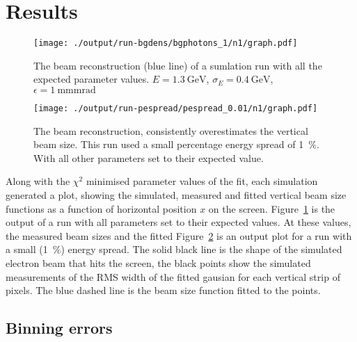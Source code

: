 
\section{Results}
\label{sec:results}


\begin{figure}[!tb]
	\centering
	\texttt{[image: ./output/run-bgdens/bgphotons\_1/n1/graph.pdf]}
	\caption{
		The beam reconstruction (blue line) of a sumlation run with all the
		expected parameter values. \(E = \SI{1.3}{\giga\electronvolt}\),
		\(\sigma_E = \SI{0.4}{\giga\electronvolt}\), \(\epsilon =
		\SI{1}{\milli\meter\milli\radian}\)
	}
	\label{fig:default}
\end{figure}

\begin{figure}[!tb]
	\centering
	\texttt{[image: ./output/run-pespread/pespread\_0.01/n1/graph.pdf]}
	\caption{
		The beam reconstruction, consistently overestimates the vertical
		beam size. This run used a small percentage energy spread of
		\SI{1}{\percent}. With all other parameters set to their expected
		value.
	}
	\label{fig:yoverestimate}
\end{figure}


Along with the \(\chi^2\) minimised parameter values of the fit, each simulation
generated a plot, showing the simulated, measured and fitted vertical beam size
functions as a function of horizontal position \(x\) on the screen.
Figure~\ref{fig:default} is the output of a run with all parameters set to their
expected values. At these values, the measured beam sizes and the fitted
Figure~\ref{fig:yoverestimate} is an output plot for a run with a small
(\SI{1}{\percent}) energy spread. The solid black line is the shape of the
simulated electron beam that hits the screen, the black points show the
simulated measurements of the RMS width of the fitted gausian for each vertical
strip of pixels. The blue dashed line is the beam size function fitted to the
points.

\subsection{Binning errors}

